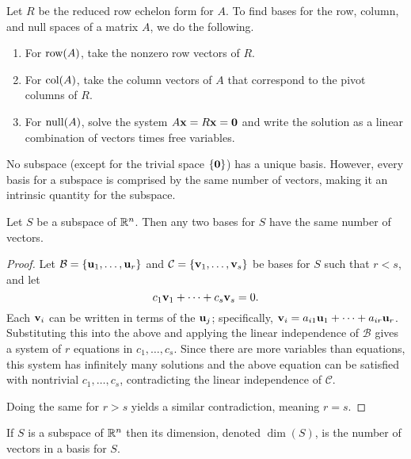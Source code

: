 \documentclass[../m073main.tex]{subfiles}
\begin{document}
\begin{theorem}
	Let $R$ be the reduced row echelon form for $A$.
	To find bases for the row, column, and null spaces of a matrix $A$, we do the following.
	\begin{enumerate}[label=(\alph*)]
		\item For $\textrm{row}(A)$, take the nonzero row vectors of $R$.
		\item For $\textrm{col}(A)$, take the column vectors of $A$ that correspond to the pivot columns of $R$.
		\item For $\textrm{null}(A)$, solve the system $A \mathbf{x} = R \mathbf{x} = \mathbf{0}$ and write the solution as a linear combination of vectors times free variables.
	\end{enumerate}
\end{theorem}

No subspace (except for the trivial space $\left\{ \mathbf{0} \right\}$) has a unique basis.
However, every basis for a subspace is comprised by the same number of vectors, making it an intrinsic quantity for the subspace.

\pagebreak

\begin{theorem}
	Let $S$ be a subspace of $\mathbb{R}^n$.
	Then any two bases for $S$ have the same number of vectors.
\end{theorem}

\begin{proof}
	Let $\mathcal{B} = \left\{ \mathbf{u}_1, \ldots, \mathbf{u}_r \right\}$ and $\mathcal{C} = \left\{ \mathbf{v}_1, \ldots, \mathbf{v}_s \right\}$ be bases for $S$ such that $r < s$, and let
	\[ c_1 \mathbf{v}_1 + \cdots + c_s \mathbf{v}_s = 0. \]
	Each $\mathbf{v}_i$ can be written in terms of the $\mathbf{u}_j$; specifically, $\mathbf{v}_i = a_{i 1} \mathbf{u}_1 + \cdots + a_{i r} \mathbf{u}_r$.
	Substituting this into the above and applying the linear independence of $\mathcal{B}$ gives a system of $r$ equations in $c_1, \ldots, c_s$.
	Since there are more variables than equations, this system has infinitely many solutions and the above equation can be satisfied with nontrivial $c_1, \ldots, c_s$, contradicting the linear independence of $\mathcal{C}$.

	Doing the same for $r > s$ yields a similar contradiction, meaning $r = s$.
\end{proof}

\begin{definition}[Dimension]
	If $S$ is a subspace of $\mathbb{R}^n$ then its dimension, denoted $\dim (S)$, is the number of vectors in a basis for $S$.
\end{definition}
\end{document}
